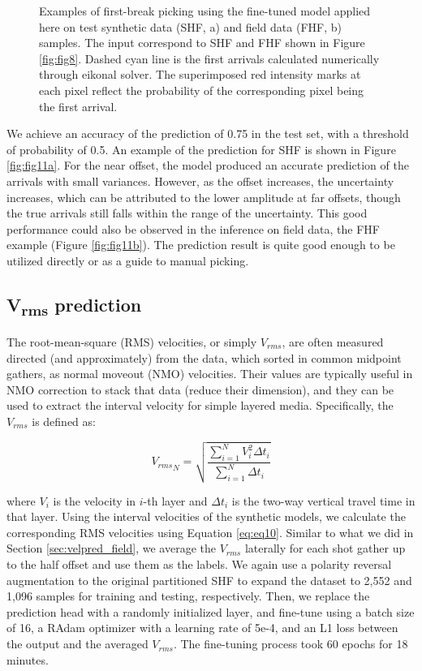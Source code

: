 \documentclass{article}
\begin{document}
\begin{figure}[h]
    \centering
    \caption{Examples of first-break picking using the fine-tuned model applied here on test synthetic data (SHF, a) and field data (FHF, b) samples. The input correspond to SHF and FHF shown in Figure \ref{fig:fig8}. Dashed cyan line is the first arrivals calculated numerically through eikonal solver. The superimposed red intensity marks at each pixel reflect the probability of the corresponding pixel being the first arrival.}
    \label{fig:fig11}
\end{figure}

We achieve an accuracy of the prediction of 0.75 in the test set, with a threshold of probability of 0.5. An example of the prediction for SHF is shown in Figure \ref{fig:fig11a}. For the near offset, the model produced an accurate prediction of the arrivals with small variances. However, as the offset increases, the uncertainty increases, which can be attributed to the lower amplitude at far offsets, though the true arrivals still falls within the range of the uncertainty. This good performance could also be observed in the inference on field data, the FHF example (Figure \ref{fig:fig11b}). The prediction result is quite good enough to be utilized directly or as a guide to manual picking. 


\subsection{V\textsubscript{rms} prediction}
The root-mean-square (RMS) velocities, or simply $V_{rms}$, are often measured directed (and approximately) from the data, which sorted in common midpoint gathers, as normal moveout (NMO) velocities. Their values are typically useful in NMO correction to stack that data (reduce their dimension), and they can be used to extract the interval velocity for simple layered media. Specifically, the $V_{rms}$ is defined as:

\begin{equation}
    \label{eq:eq10}
    {V_{rms}}_N = \sqrt{\frac{\sum_{i=1}^{N} V_i^2 \Delta t_i}{\sum_{i=1}^{N} \Delta t_i}}
\end{equation}

where $V_i$ is the velocity in $i$-th layer and $\Delta t_i$ is the two-way vertical travel time in that layer. Using the interval velocities of the synthetic models, we calculate the corresponding RMS velocities using Equation \ref{eq:eq10}. Similar to what we did in Section \ref{sec:velpred_field}, we average the $V_{rms}$ laterally for each shot gather up to the half offset and use them as the labels. We again use a polarity reversal augmentation to the original partitioned SHF to expand the dataset to 2,552 and 1,096 samples for training and testing, respectively. Then, we replace the prediction head with a randomly initialized layer, and fine-tune using a batch size of 16, a RAdam optimizer with a learning rate of 5e-4, and an L1 loss between the output and the averaged $V_{rms}$. The fine-tuning process took 60 epochs for 18 minutes.
\end{document}
